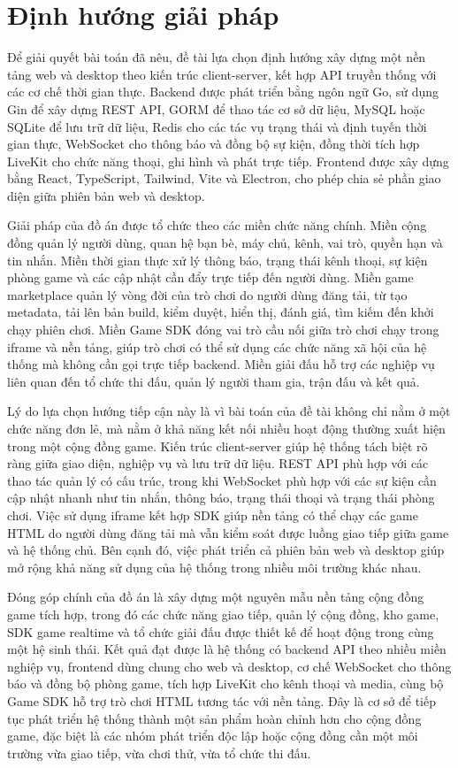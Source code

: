 \documentclass[../DoAn.tex]{subfiles}
\begin{document}
\section{Định hướng giải pháp}
\label{section:1.3}

Để giải quyết bài toán đã nêu, đề tài lựa chọn định hướng xây dựng một nền tảng web và desktop theo kiến trúc client-server, kết hợp API truyền thống với các cơ chế thời gian thực. Backend được phát triển bằng ngôn ngữ Go, sử dụng Gin để xây dựng REST API, GORM để thao tác cơ sở dữ liệu, MySQL hoặc SQLite để lưu trữ dữ liệu, Redis cho các tác vụ trạng thái và định tuyến thời gian thực, WebSocket cho thông báo và đồng bộ sự kiện, đồng thời tích hợp LiveKit cho chức năng thoại, ghi hình và phát trực tiếp. Frontend được xây dựng bằng React, TypeScript, Tailwind, Vite và Electron, cho phép chia sẻ phần giao diện giữa phiên bản web và desktop.

Giải pháp của đồ án được tổ chức theo các miền chức năng chính. Miền cộng đồng quản lý người dùng, quan hệ bạn bè, máy chủ, kênh, vai trò, quyền hạn và tin nhắn. Miền thời gian thực xử lý thông báo, trạng thái kênh thoại, sự kiện phòng game và các cập nhật cần đẩy trực tiếp đến người dùng. Miền game marketplace quản lý vòng đời của trò chơi do người dùng đăng tải, từ tạo metadata, tải lên bản build, kiểm duyệt, hiển thị, đánh giá, tìm kiếm đến khởi chạy phiên chơi. Miền Game SDK đóng vai trò cầu nối giữa trò chơi chạy trong iframe và nền tảng, giúp trò chơi có thể sử dụng các chức năng xã hội của hệ thống mà không cần gọi trực tiếp backend. Miền giải đấu hỗ trợ các nghiệp vụ liên quan đến tổ chức thi đấu, quản lý người tham gia, trận đấu và kết quả.

Lý do lựa chọn hướng tiếp cận này là vì bài toán của đề tài không chỉ nằm ở một chức năng đơn lẻ, mà nằm ở khả năng kết nối nhiều hoạt động thường xuất hiện trong một cộng đồng game. Kiến trúc client-server giúp hệ thống tách biệt rõ ràng giữa giao diện, nghiệp vụ và lưu trữ dữ liệu. REST API phù hợp với các thao tác quản lý có cấu trúc, trong khi WebSocket phù hợp với các sự kiện cần cập nhật nhanh như tin nhắn, thông báo, trạng thái thoại và trạng thái phòng chơi. Việc sử dụng iframe kết hợp SDK giúp nền tảng có thể chạy các game HTML do người dùng đăng tải mà vẫn kiểm soát được luồng giao tiếp giữa game và hệ thống chủ. Bên cạnh đó, việc phát triển cả phiên bản web và desktop giúp mở rộng khả năng sử dụng của hệ thống trong nhiều môi trường khác nhau.

Đóng góp chính của đồ án là xây dựng một nguyên mẫu nền tảng cộng đồng game tích hợp, trong đó các chức năng giao tiếp, quản lý cộng đồng, kho game, SDK game realtime và tổ chức giải đấu được thiết kế để hoạt động trong cùng một hệ sinh thái. Kết quả đạt được là hệ thống có backend API theo nhiều miền nghiệp vụ, frontend dùng chung cho web và desktop, cơ chế WebSocket cho thông báo và đồng bộ phòng game, tích hợp LiveKit cho kênh thoại và media, cùng bộ Game SDK hỗ trợ trò chơi HTML tương tác với nền tảng. Đây là cơ sở để tiếp tục phát triển hệ thống thành một sản phẩm hoàn chỉnh hơn cho cộng đồng game, đặc biệt là các nhóm phát triển độc lập hoặc cộng đồng cần một môi trường vừa giao tiếp, vừa chơi thử, vừa tổ chức thi đấu.
\end{document}
